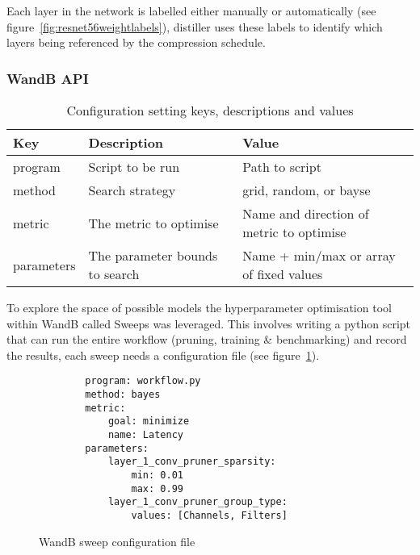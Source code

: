 \documentclass[../Dissertation.tex]{subfiles}
\begin{document}
Each layer in the network is labelled either manually or automatically (see figure~\ref{fig:resnet56weightlabels}), distiller uses these labels to identify which layers being referenced by the compression schedule. 

\subsubsection{WandB API}

\begin{table}[H]
    \begin{tabular}{@{}|l|l|l|@{}}
    \toprule
    Key        & Description                    & Value                                    \\ \midrule
    program    & Script to be run               & Path to script                           \\ \midrule
    method     & Search strategy                & grid, random, or bayse                   \\ \midrule
    metric     & The metric to optimise         & Name and direction of metric to optimise \\ \midrule
    parameters & The parameter bounds to search & Name + min/max or array of fixed values  \\ \bottomrule
    \end{tabular}
    \caption{Configuration setting keys, descriptions and values}
    \label{tab:WandBConfig}
\end{table}

To explore the space of possible models the hyperparameter optimisation tool within WandB called Sweeps was leveraged. 
This involves writing a python script that can run the entire workflow (pruning, training \& benchmarking) and record the results, each sweep needs a configuration file (see figure~\ref{fig:sweepConfig}).


\singlespacing
\begin{figure}[H]
    \begin{verbatim}
        program: workflow.py
        method: bayes
        metric:
            goal: minimize
            name: Latency
        parameters:
            layer_1_conv_pruner_sparsity:
                min: 0.01
                max: 0.99
            layer_1_conv_pruner_group_type:
                values: [Channels, Filters]
    \end{verbatim}
    \caption{WandB sweep configuration file}
    \label{fig:sweepConfig}
\end{figure}
\doublespacing
\end{document}
